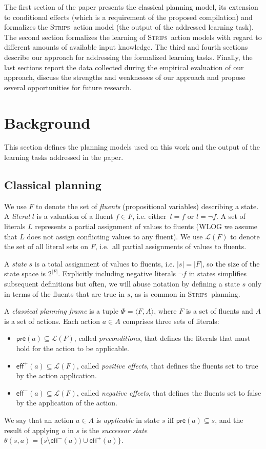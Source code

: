 \documentclass[letterpaper]{article} %
\newcommand{\tup}[1]{{\langle #1 \rangle}}
\newcommand{\pre}{\mathsf{pre}}     %
\newcommand{\eff}{\mathsf{eff}}     %
\newcommand{\strips}{\textsc{Strips}}     %
\begin{document}
The first section of the paper presents the classical planning model, its extension to conditional effects (which is a requirement of the proposed compilation) and formalizes the \strips\ action model (the output of the addressed learning task). The second section formalizes the learning of \strips\ action models with regard to different amounts of available input knowledge. The third and fourth sections describe our approach for addressing the formalized learning tasks. Finally, the last sections report the data collected during the empirical evaluation of our approach, discuss the strengths and weaknesses of our approach and propose several opportunities for future research.


\section{Background}
This section defines the planning models used on this work and the output of the learning tasks addressed in the paper.

\subsection{Classical planning}
We use $F$ to denote the set of {\em fluents} (propositional variables) describing a state. A {\em literal} $l$ is a valuation of a fluent $f\in F$, i.e. either~$l=f$ or $l=\neg f$. A set of literals $L$ represents a partial assignment of values to fluents (WLOG we assume that $L$ does not assign conflicting values to any fluent). We use $\mathcal{L}(F)$ to denote the set of all literal sets on $F$, i.e.~all partial assignments of values to fluents.

A {\em state} $s$ is a total assignment of values to fluents, i.e. $|s|=|F|$, so the size of the state space is $2^{|F|}$. Explicitly including negative literals $\neg f$ in states simplifies subsequent definitions but often, we will abuse notation by defining a state $s$ only in terms of the fluents that are true in $s$, as is common in \strips\ planning.

A {\em classical planning frame} is a tuple $\Phi=\tup{F,A}$, where $F$ is a set of fluents and $A$ is a set of actions. Each action $a\in A$ comprises three sets of literals:
\begin{itemize}
\item $\pre(a)\subseteq\mathcal{L}(F)$, called {\em preconditions}, that defines the literals that must hold for the action to be applicable.
\item $\eff^+(a)\subseteq\mathcal{L}(F)$, called {\em positive effects}, that defines the fluents set to true by the action application.
\item $\eff^-(a)\subseteq\mathcal{L}(F)$, called {\em negative effects}, that defines the fluents set to false by the application of the action.
\end{itemize}
We say that an action $a\in A$ is {\em applicable} in state $s$ iff $\pre(a)\subseteq s$, and the result of applying $a$ in $s$ is the {\em successor state} $\theta(s,a)=\{s\setminus\eff^-(a))\cup\eff^+(a)\}$.
\end{document}
